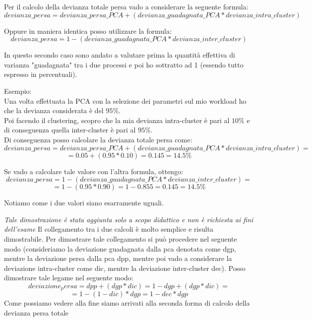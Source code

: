 Per il calcolo della devianza totale persa vado a considerare la seguente formula:
\[
devianza\_persa = devianza\_persa\_PCA + (devianza\_guadagnata\_PCA * devianza\_intra\_cluster)
\]

Oppure in maniera identica posso utilizzare la formula:
\[
devianza\_persa = 1 - (devianza\_guadagnata\_PCA * devianza\_inter\_cluster)
\]

In questo secondo caso sono andato a valutare prima la quantità effettiva di varianza "guadagnata" tra i due processi e poi ho sottratto ad 1 (essendo tutto espresso in percentuali).

Esempio:\\
Una volta effettuata la PCA con la selezione dei parametri sul mio workload ho che la devianza considerata è del \(95\%\).\\
Poi facendo il clustering, scopro che la mia devianza intra-cluster è pari al \(10\%\) e di conseguenza quella inter-cluster è pari al \(95\%\).\\
Di conseguenza posso calcolare la devianza totale persa come:
\[
devianza\_persa = devianza\_persa\_PCA + (devianza\_guadagnata\_PCA * devianza\_intra\_cluster)=
\]
\[
= 0.05 + (0.95 * 0.10) = 0.145 = 14.5\%
\]

Se vado a calcolare tale valore con l'altra formula, ottengo:
\[
devianza\_persa = 1 - (devianza\_guadagnata\_PCA * devianza\_inter\_cluster)=
\]
\[
= 1 - (0.95 * 0.90) = 1 - 0.855 = 0.145 = 14.5\%
\]

Notiamo come i due valori siano esarramente uguali.

\begin{info}
\textit{Tale dimostrazione è stata aggiunta solo a scopo didattico e non è richiesta ai fini dell'esame}
Il collegamento tra i due calcoli è molto semplice e risulta dimostrabile. Per dimostrare tale collegamento si può procedere nel seguente modo (consideriamo la deviazione guadagnata dalla pca denotata come dgp, mentre la deviazione persa dalla pca dpp, mentre poi vado a considerare la deviazione intra-cluster come dic, mentre la deviazione inter-cluster dec). Posso dimostrare tale legame nel seguente modo:
\[
deviazione_persa = dpp + (dgp * dic) = 1 - dgp + (dgp * dic)=
\]
\[
= 1 - (1 - dic) * dgp = 1 - dec * dgp
\]
Come possiamo vedere alla fine siamo arrivati alla seconda forma di calcolo della devianza persa totale
\end{info}

